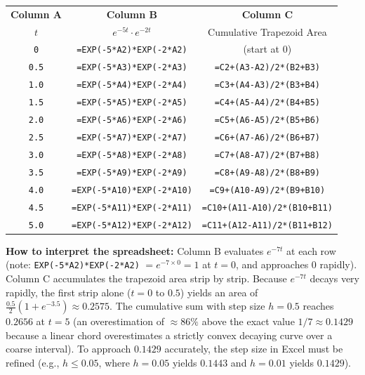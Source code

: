 \documentclass[12pt,a4paper]{article}
\begin{document}
\medskip
\begin{center}
\begin{tabular}{@{}ccc@{}}
\toprule
\textbf{Column A} & \textbf{Column B} & \textbf{Column C} \\
$t$ & $e^{-5t} \cdot e^{-2t}$ & Cumulative Trapezoid Area \\
\midrule
\texttt{0}    & \texttt{=EXP(-5*A2)*EXP(-2*A2)}  & (start at 0) \\
\texttt{0.5}  & \texttt{=EXP(-5*A3)*EXP(-2*A3)}  & \texttt{=C2+(A3-A2)/2*(B2+B3)} \\
\texttt{1.0}  & \texttt{=EXP(-5*A4)*EXP(-2*A4)}  & \texttt{=C3+(A4-A3)/2*(B3+B4)} \\
\texttt{1.5}  & \texttt{=EXP(-5*A5)*EXP(-2*A5)}  & \texttt{=C4+(A5-A4)/2*(B4+B5)} \\
\texttt{2.0}  & \texttt{=EXP(-5*A6)*EXP(-2*A6)}  & \texttt{=C5+(A6-A5)/2*(B5+B6)} \\
\texttt{2.5}  & \texttt{=EXP(-5*A7)*EXP(-2*A7)}  & \texttt{=C6+(A7-A6)/2*(B6+B7)} \\
\texttt{3.0}  & \texttt{=EXP(-5*A8)*EXP(-2*A8)}  & \texttt{=C7+(A8-A7)/2*(B7+B8)} \\
\texttt{3.5}  & \texttt{=EXP(-5*A9)*EXP(-2*A9)}  & \texttt{=C8+(A9-A8)/2*(B8+B9)} \\
\texttt{4.0}  & \texttt{=EXP(-5*A10)*EXP(-2*A10)} & \texttt{=C9+(A10-A9)/2*(B9+B10)} \\
\texttt{4.5}  & \texttt{=EXP(-5*A11)*EXP(-2*A11)} & \texttt{=C10+(A11-A10)/2*(B10+B11)} \\
\texttt{5.0}  & \texttt{=EXP(-5*A12)*EXP(-2*A12)} & \texttt{=C11+(A12-A11)/2*(B11+B12)} \\
\bottomrule
\end{tabular}
\end{center}

\medskip
\noindent\textbf{How to interpret the spreadsheet:}
Column B evaluates $e^{-7t}$ at each row (note: \texttt{EXP(-5*A2)*EXP(-2*A2)}
$= e^{-7 \times 0} = 1$ at $t=0$, and approaches 0 rapidly).
Column C accumulates the trapezoid area strip by strip.
Because $e^{-7t}$ decays very rapidly, the first strip alone ($t=0$ to $0.5$)
yields an area of $\frac{0.5}{2}(1 + e^{-3.5}) \approx 0.2575$.
The cumulative sum with step size $h = 0.5$ reaches $\mathbf{0.2656}$ at $t = 5$
(an overestimation of $\approx 86\%$ above the exact value $1/7 \approx 0.1429$
because a linear chord overestimates a strictly convex decaying curve over a coarse interval).
To approach $\mathbf{0.1429}$ accurately, the step size in Excel must be refined
(e.g., $h \le 0.05$, where $h=0.05$ yields $0.1443$ and $h=0.01$ yields $0.1429$).
\end{document}
